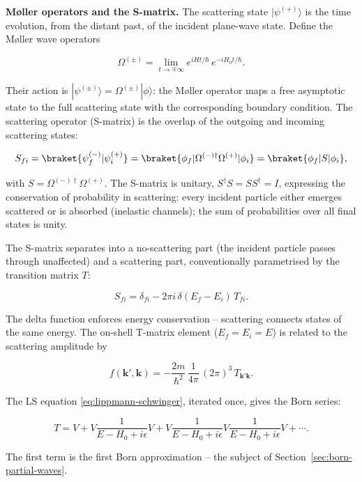 \medskip\noindent\textbf{M\o{}ller operators and the S-matrix.}
The scattering state $|\psi^{(+)}\rangle$ is the time evolution, from the distant past, of the incident plane-wave state. Define the M\o{}ller wave operators
\begin{linenomath}
\begin{equation}
\Omega^{(\pm)} = \lim_{t\to\mp\infty} e^{iHt/\hbar}\,e^{-iH_{0}t/\hbar}.
\label{eq:moller-operators}
\end{equation}
\end{linenomath}
Their action is $|\psi^{(\pm)}\rangle = \Omega^{(\pm)}|\phi\rangle$: the M\o{}ller operator maps a free asymptotic state to the full scattering state with the corresponding boundary condition. The scattering operator (S-matrix) is the overlap of the outgoing and incoming scattering states:
\begin{linenomath}
\begin{equation}
S_{fi} = \braket{\psi_{f}^{(-)}|\psi_{i}^{(+)}} = \braket{\phi_{f}|\Omega^{(-)\dagger}\Omega^{(+)}|\phi_{i}} = \braket{\phi_{f}|S|\phi_{i}},
\label{eq:S-matrix-def}
\end{equation}
\end{linenomath}
with $S = \Omega^{(-)\dagger}\Omega^{(+)}$. The S-matrix is unitary, $S^{\dagger}S = SS^{\dagger} = I$, expressing the conservation of probability in scattering: every incident particle either emerges scattered or is absorbed (inelastic channels); the sum of probabilities over all final states is unity.

The S-matrix separates into a no-scattering part (the incident particle passes through unaffected) and a scattering part, conventionally parametrised by the transition matrix $T$:
\begin{linenomath}
\begin{equation*}
S_{fi} = \delta_{fi} - 2\pi i\,\delta(E_{f}-E_{i})\,T_{fi}.
\end{equation*}
\end{linenomath}
The delta function enforces energy conservation -- scattering connects states of the same energy. The on-shell T-matrix element ($E_{f}=E_{i}=E$) is related to the scattering amplitude by
\begin{linenomath}
\begin{equation*}
f(\bm k',\bm k) = -\frac{2m}{\hbar^{2}}\,\frac{1}{4\pi}\,(2\pi)^{3}\,T_{\bm k'\bm k}.
\end{equation*}
\end{linenomath}
The LS equation \eqref{eq:lippmann-schwinger}, iterated once, gives the Born series:
\begin{linenomath}
\begin{equation*}
T = V + V\frac{1}{E-H_{0}+i\epsilon}V + V\frac{1}{E-H_{0}+i\epsilon}V\frac{1}{E-H_{0}+i\epsilon}V + \cdots .
\end{equation*}
\end{linenomath}
The first term is the first Born approximation -- the subject of Section~\ref{sec:born-partial-waves}.


